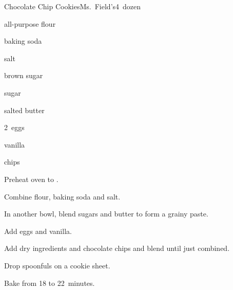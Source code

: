 \begin{recipe}{Chocolate Chip Cookies}{Ms.~Field's}{4~dozen}

\begin{ingredients}
\item \C{2\half} all-purpose flour
\item \tp{\half} baking soda
\item \tp{\quarter} salt
\item {} brown sugar
\item \C{\half} sugar
\item {} salted butter
\item 2~eggs
\item {} vanilla
\item {}  chips
\end{ingredients}

\begin{directions}
\item Preheat oven to .
\item Combine flour, baking soda and salt.
\item In another bowl, blend sugars and butter to form a grainy paste.
\item Add eggs and vanilla.
\item Add dry ingredients and chocolate chips and blend until just combined.
\item Drop spoonfuls on a cookie sheet.
\item Bake from 18 to 22~minutes.
\end{directions}
\end{recipe}
